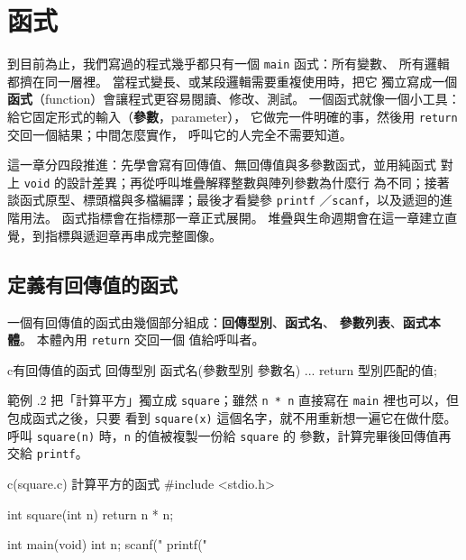 \chapter{函式}
\label{ch:function}

到目前為止，我們寫過的程式幾乎都只有一個 \texttt{main} 函式：所有變數、
所有邏輯都擠在同一層裡。 當程式變長、或某段邏輯需要重複使用時，把它
獨立寫成一個\textbf{函式}（function）會讓程式更容易閱讀、修改、測試。
一個函式就像一個小工具：給它固定形式的輸入（\textbf{參數}，parameter），
它做完一件明確的事，然後用 \texttt{return} 交回一個結果；中間怎麼實作，
呼叫它的人完全不需要知道。

這一章分四段推進：先學會寫有回傳值、無回傳值與多參數函式，並用純函式
對上 \texttt{void} 的設計差異；再從呼叫堆疊解釋整數與陣列參數為什麼行
為不同；接著談函式原型、標頭檔與多檔編譯；最後才看變參 \texttt{printf}
／\texttt{scanf}，以及遞迴的進階用法。 函式指標會在指標那一章正式展開。
堆疊與生命週期會在這一章建立直覺，到指標與遞迴章再串成完整圖像。

\section{定義有回傳值的函式}
\label{sec:func-return-value}

一個有回傳值的函式由幾個部分組成：\textbf{回傳型別}、\textbf{函式名}、
\textbf{參數列表}、\textbf{函式本體}。 本體內用 \texttt{return} 交回一個
值給呼叫者。

\begin{code}{c}{有回傳值的函式}
回傳型別 函式名(參數型別 參數名) {
    ...
    return 型別匹配的值;
}
\end{code}

範例 \thechapter.2 把「計算平方」獨立成 \texttt{square}；雖然
\texttt{n * n} 直接寫在 \texttt{main} 裡也可以，但包成函式之後，只要
看到 \texttt{square(x)} 這個名字，就不用重新想一遍它在做什麼。 呼叫
\texttt{square(n)} 時，\texttt{n} 的值被複製一份給 \texttt{square} 的
參數，計算完畢後回傳值再交給 \texttt{printf}。

\begin{example}{c}{(square.c) 計算平方的函式}
#include <stdio.h>

int square(int n) {
    return n * n;
}

int main(void) {
    int n;
    scanf("%
    printf("%
}
\end{example}


